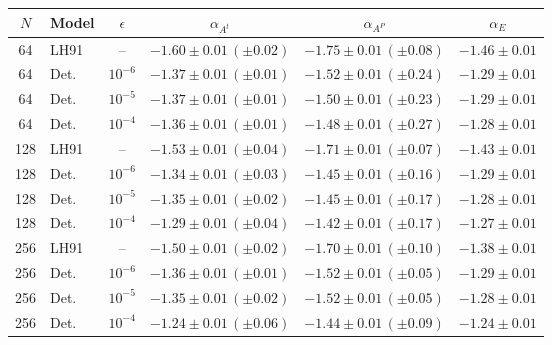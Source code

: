 \begin{tabular}{|c|l|c|c|c|c|}
\hline
\rowcolor[HTML]{C0C0C0}
$N$ & Model & $\epsilon$ & $\alpha_{A^{t}}$ & $\alpha_{A^{P}}$ & $\alpha_{E}$ \\ \hline
64 & LH91 & -- & $-1.60\pm0.01\,(\pm0.02)$ & $-1.75\pm0.01\,(\pm0.08)$ & $-1.46\pm0.01$ \\
64 & Det. & $10^{-6}$ & $-1.37\pm0.01\,(\pm0.01)$ & $-1.52\pm0.01\,(\pm0.24)$ & $-1.29\pm0.01$ \\
64 & Det. & $10^{-5}$ & $-1.37\pm0.01\,(\pm0.01)$ & $-1.50\pm0.01\,(\pm0.23)$ & $-1.29\pm0.01$ \\
64 & Det. & $10^{-4}$ & $-1.36\pm0.01\,(\pm0.01)$ & $-1.48\pm0.01\,(\pm0.27)$ & $-1.28\pm0.01$ \\
\hline
128 & LH91 & -- & $-1.53\pm0.01\,(\pm0.04)$ & $-1.71\pm0.01\,(\pm0.07)$ & $-1.43\pm0.01$ \\
128 & Det. & $10^{-6}$ & $-1.34\pm0.01\,(\pm0.03)$ & $-1.45\pm0.01\,(\pm0.16)$ & $-1.29\pm0.01$ \\
128 & Det. & $10^{-5}$ & $-1.35\pm0.01\,(\pm0.02)$ & $-1.45\pm0.01\,(\pm0.17)$ & $-1.28\pm0.01$ \\
128 & Det. & $10^{-4}$ & $-1.29\pm0.01\,(\pm0.04)$ & $-1.42\pm0.01\,(\pm0.17)$ & $-1.27\pm0.01$ \\
\hline
256 & LH91 & -- & $-1.50\pm0.01\,(\pm0.02)$ & $-1.70\pm0.01\,(\pm0.10)$ & $-1.38\pm0.01$ \\
256 & Det. & $10^{-6}$ & $-1.36\pm0.01\,(\pm0.01)$ & $-1.52\pm0.01\,(\pm0.05)$ & $-1.29\pm0.01$ \\
256 & Det. & $10^{-5}$ & $-1.35\pm0.01\,(\pm0.02)$ & $-1.52\pm0.01\,(\pm0.05)$ & $-1.28\pm0.01$ \\
256 & Det. & $10^{-4}$ & $-1.24\pm0.01\,(\pm0.06)$ & $-1.44\pm0.01\,(\pm0.09)$ & $-1.24\pm0.01$ \\
\hline
\end{tabular}
